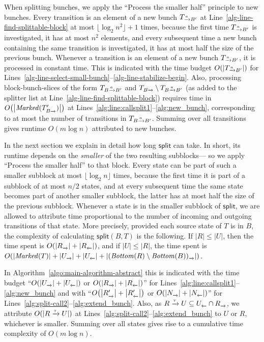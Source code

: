 \documentclass[a4paper,10pt]{article}
\theoremstyle{definition}
\theoremstyle{plain}
\newcommand{\bigo}[1]{{O\!\left(#1\right)}}
\newcommand{\pijl}[1]{\mathrel{\text{$\xrightarrow{\smash[t]{#1}}$}}}
\newcommand{\lijp}[1]{\mathrel{\text{$\xleftarrow{\smash[t]{#1}}$}}}
\newcommand{\size}[1]{\left\lvert #1 \right\rvert}
\newcommand{\TB}{T_{B\pijl{}}}
\newcommand{\TBaB}{T_{B\pijl{a} B'}}
\newcommand{\TaB}{T_{\pijl{a} B'}}
\newcommand{\Bottom}{\mathit{Bottom}}
\newcommand{\Marked}{\mathit{Marked}}
\begin{document}
When splitting bunches, we apply the ``Process the smaller half'' principle to new bunches.
Every transition is an element of a new bunch $\TaB$ at Line~\ref{alg-line-find-splittable-block} at most $\lfloor \log_2 n^2 \rfloor + 1$ times,
because the first time $\TaB$ is investigated, it has at most $n^2$ elements,
and every subsequent time a new bunch containing the same transition is investigated,
it has at most half the size of the previous bunch.
Whenever a transition is an element of a new bunch $\TaB$,
it is processed in constant time.
This is indicated with the time budget $\bigo{\size{\TaB}}$ for Lines~\ref{alg-line-select-small-bunch}--\ref{alg-line-stabilize-begin}.
Also, processing block-bunch-slices of the form $\TBaB$ and $\TB \setminus \TBaB$
(as added to the splitter list at Line~\ref{alg-line-find-splittable-block})
requires time in $\bigo{\size{\Marked(\TB')}}$ at Lines~\ref{alg:line:callsplit1}--\ref{alg:new_bunch},
corresponding to at most the number of transitions in $\TBaB$.
Summing over all transitions gives runtime $\bigo{m \log n}$
attributed to new bunches.

In the next section we explain in detail how long $\mathsf{split}$ can take.
In short, its runtime depends on the \emph{smaller} of the two resulting subblocks---%
so we apply ``Process the smaller half'' to that block.
Every state can be part of such a smaller subblock  at most $\lfloor \log_2 n \rfloor$ times,
because the first time it is part of a subblock of at most $n/2$ states,
and at every subsequent time the same state becomes part of another smaller subblock,
the latter has at most half the size of the previous subblock.
Whenever a state is in the smaller subblock of $\mathsf{split}$,
we are allowed to attribute time proportional to the number of incoming and outgoing transitions of that state.
More precisely, provided each source state of $T$ is in $B$, the complexity of calculating $\mathsf{split}(B,T)$ is the following.
If $\size{R} \leq \size{U}$, then the time spent is $\bigo{\size{R_{\pijl{}}} + \size{R_{\lijp{}}}}$,
and if $\size{U} \leq \size{R}$, the time spent is $\bigo{\size{\Marked(T)} +\size{U_{\pijl{}}} + \size{U_{\lijp{}}} + \size{(\Bottom(R)\setminus \Bottom(B))_{\pijl{}}}}$.

In Algorithm~\ref{algo:main-algorithm-abstract} this is indicated with the time budget ``$\bigo{\size{U_{\pijl{}}} + \size{U_{\lijp{}}}}$ or $\bigo{\size{R_{\pijl{}}} + \size{R_{\lijp{}}}}$'' for Lines~\ref{alg:line:callsplit1}--\ref{alg:new_bunch}
and with ``$\bigo{\size{R'_{\pijl{}}} + \size{R'_{\lijp{}}}}$ or $\bigo{\size{N_{\pijl{}}} + \size{N_{\lijp{}}}}$'' for Lines~\ref{alg:split-call2}--\ref{alg:extend_bunch}.
Also, as $R \pijl{\tau} U \subseteq U_{\lijp{}} \cap R_{\pijl{}}$,
we attribute $\bigo{\size{R \pijl{\tau} U}}$ at Lines~\ref{alg:split-call2}--\ref{alg:extend_bunch} to $U$ or $R$, whichever is smaller.
Summing over all states gives rise to a cumulative time complexity of $\bigo{m \log n}$.
\end{document}
